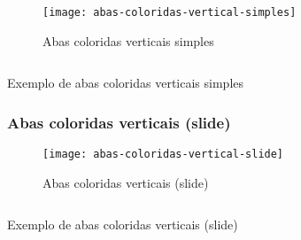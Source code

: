 \begin{figure}[!ht]
    \centering
    \texttt{[image: abas-coloridas-vertical-simples]}
    \caption{Abas coloridas verticais simples}\label{RS0001:fig:abas-coloridas-vertical-simples}
\end{figure}

\begin{code}
    \inputminted[label=abas-abas-coloridas-vertical-simples.html]{html}{../RS0001/anexos/abas-coloridas-vertical-simples.html}
    \caption{Exemplo de abas coloridas verticais simples}\label{RS0001:code:exemplo-abas-coloridas-vertical-simples}
\end{code}


\subsubsection{Abas coloridas verticais (slide)}

\begin{figure}[!ht]
    \centering
    \texttt{[image: abas-coloridas-vertical-slide]}
    \caption{Abas coloridas verticais (slide)}\label{RS0001:fig:abas-coloridas-vertical-slide}
\end{figure}

\begin{code}
    \inputminted[label=abas-abas-coloridas-vertical-slide.html]{html}{../RS0001/anexos/abas-coloridas-vertical-slide.html}
    \caption{Exemplo de abas coloridas verticais (slide)}\label{RS0001:code:exemplo-abas-coloridas-vertical-slide}
\end{code}